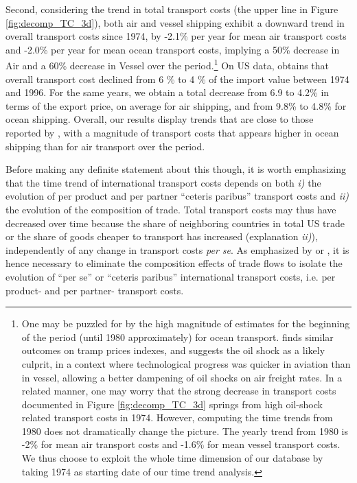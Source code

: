 \documentclass[a4paper,11pt]{article}
\begin{document}
Second, considering the trend in total transport costs (the upper line in Figure \ref{fig:decomp_TC_3d}), both air and vessel shipping exhibit a downward trend in overall transport costs since 1974, by -2.1\% per year for mean air transport costs and -2.0\% per year for mean ocean transport costs, implying a 50\% decrease in Air and a 60\% decrease in Vessel over the period.\footnote{One may be puzzled for by the high magnitude of estimates for the beginning of the period (until 1980 approximately) for ocean transport. \citet{hummels2007} finds similar outcomes on tramp prices indexes, and suggests the oil shock as a likely culprit, in a context where technological progress was quicker in aviation than in vessel, allowing a better dampening of oil shocks on air freight rates. In a related manner, one may worry that the strong decrease in transport costs documented in Figure \ref{fig:decomp_TC_3d} springs from high oil-shock related transport costs in 1974. However, computing the time trends from 1980 does not dramatically change the picture. The yearly trend from 1980 is -2\% for mean air transport costs and -1.6\% for mean vessel transport costs. We thus choose to exploit the whole time dimension of our database by taking 1974 as starting date of our time trend analysis.} On US data, \citet{Hummels_1999} obtains that overall transport cost declined from 6 \% to 4 \% of the import value between 1974 and 1996. For the same years, we obtain a total decrease from 6.9 to 4.2\% in terms of the export price, on average for air shipping, and from 9.8\% to 4.8\% for ocean shipping. Overall, our results display trends that are close to those reported by \citet{Hummels_1999}, with a magnitude of transport costs that appears higher in ocean shipping than for air transport over the period.\smallskip


Before making any definite statement about this though, it is worth emphasizing that the time trend of international transport costs depends on both \textit{i)} the evolution of per product and per partner ``ceteris paribus'' transport costs and \textit{ii)} the evolution of the composition of trade. Total transport costs may thus have decreased over time because the share of neighboring countries in total US trade or the share of goods cheaper to transport has increased (explanation \textit{ii)}), independently of any change in transport costs \textit{per se}. As emphasized by \citet{Hummels_1999} or \cite{hummels2007}, it is hence necessary to eliminate the composition effects of trade flows to isolate the evolution of ``per se'' or ``ceteris paribus'' international transport costs, i.e. per product- and per partner- transport costs.
\end{document}
